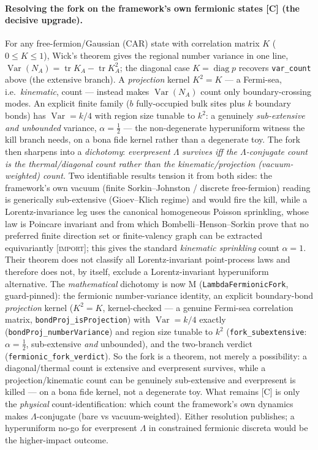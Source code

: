 \documentclass[11pt]{article}
\newcommand{\Lam}{\Lambda}
\newcommand{\Kernel}{\textcolor{kcol}{\textsc{M}}}       %
\newcommand{\Import}{\textcolor{icol}{\textsc{[import]}}} %
\newcommand{\Conj}{\textcolor{ccol}{\textsc{[C]}}}        %
\newcommand{\lm}[1]{\texttt{#1}}
\begin{document}
\paragraph{Resolving the fork on the framework's own fermionic states \Conj{}
(the decisive upgrade).}  For any free-fermion/Gaussian (CAR) state with
correlation matrix $K$ ($0\le K\le1$), Wick's theorem gives the regional number
variance in one line,
$\operatorname{Var}(N_A)=\operatorname{tr}K_A-\operatorname{tr}K_A^2$; the diagonal
case $K=\operatorname{diag}p$ recovers \lm{var\_count} above (the extensive
branch).  A \emph{projection} kernel $K^2=K$ --- a Fermi-sea, i.e.\
\emph{kinematic}, count --- instead makes $\operatorname{Var}(N_A)$ count only
boundary-crossing modes.  An explicit finite family ($b$ fully-occupied bulk sites
plus $k$ boundary bonds) has $\operatorname{Var}=k/4$ with region size tunable to
$k^2$: a genuinely \emph{sub-extensive and unbounded} variance, $\alpha=\tfrac12$
--- the non-degenerate hyperuniform witness the kill branch needs, on a bona fide
kernel rather than a degenerate toy.  The fork then sharpens into a
\emph{dichotomy}: \emph{everpresent $\Lam$ survives iff the $\Lam$-conjugate count
is the thermal/diagonal count rather than the kinematic/projection
(vacuum-weighted) count.}  Two identifiable results tension it from both sides:
the framework's own vacuum (finite Sorkin--Johnston / discrete free-fermion) reading
is generically sub-extensive (Gioev--Klich regime) and would fire the kill, while a
Lorentz-invariance leg uses the canonical homogeneous Poisson sprinkling, whose law is
Poincare invariant and from which Bombelli--Henson--Sorkin prove that no preferred finite
direction set or finite-valency graph can be extracted equivariantly \Import; this gives the
standard \emph{kinematic sprinkling} count $\alpha=1$.  Their theorem does not classify all
Lorentz-invariant point-process laws and therefore does not, by itself, exclude a Lorentz-invariant
hyperuniform alternative.  The \emph{mathematical} dichotomy is now \Kernel{} (\lm{LambdaFermionicFork},
guard-pinned): the fermionic number-variance identity, an explicit boundary-bond
\emph{projection} kernel ($K^2=K$, kernel-checked --- a genuine Fermi-sea
correlation matrix, \lm{bondProj\_isProjection}) with $\operatorname{Var}=k/4$
exactly (\lm{bondProj\_numberVariance}) and region size tunable to $k^2$
(\lm{fork\_subextensive}: $\alpha=\tfrac12$, sub-extensive \emph{and} unbounded),
and the two-branch verdict (\lm{fermionic\_fork\_verdict}).  So the fork is a
theorem, not merely a possibility: a diagonal/thermal count is extensive and
everpresent survives, while a projection/kinematic count can be genuinely
sub-extensive and everpresent is killed --- on a bona fide kernel, not a
degenerate toy.  What remains \Conj{} is only the \emph{physical}
count-identification: which count the framework's own dynamics makes
$\Lam$-conjugate (bare vs vacuum-weighted).  Either resolution publishes; a
hyperuniform no-go for everpresent $\Lam$ in constrained fermionic discreta would
be the higher-impact outcome.
\end{document}
